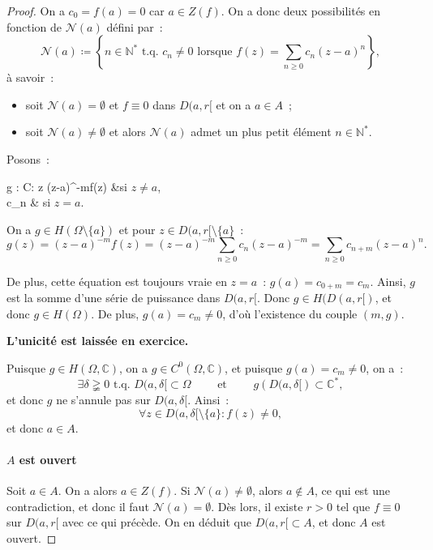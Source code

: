 \documentclass{report}
\theoremstyle{definition}
\theoremstyle{remark}
\numberwithin{equation}{section}
\newcommand{\C}{\mathbb C}
\newcommand{\N}{\mathbb N}
\newcommand{\tq}{\text{ t.q. }}
\begin{document}
\begin{proof}
			On a $c_0 = f(a) = 0$ car $a \in Z(f)$. On a donc deux possibilités en fonction de $\mathcal N(a)$ défini par~:
			\begin{equation}
				\mathcal N(a) \coloneqq \left\{n \in \N^* \tq c_n \neq 0 \text{ lorsque } f(z) = \sum_{n \geq 0}c_n(z-a)^n\right\},
			\end{equation}
			à savoir~:
			\begin{itemize}
				\item soit $\mathcal N(a) = \emptyset$ et $f \equiv 0$ dans $D(a, r[$ et on a $a \in A$~;
				\item soit $\mathcal N(a) \neq \emptyset$ et alors $\mathcal N(a)$ admet un plus petit élément $n \in \N^*$.
			\end{itemize}

			Posons~:
			\begin{subnumcases}
				{g : \Omega \to \C : z \mapsto}
					(z-a)^{-m}f(z) &si $z \neq a$, \\
					c_n & si $z = a$.
			\end{subnumcases}

			On a $g \in H(\Omega \setminus \{a\})$ et pour $z \in D(a, r[ \setminus \{a\}$~:
			\begin{equation}
				g(z) = (z-a)^{-m}f(z) = (z-a)^{-m}\sum_{n \geq 0}c_n(z-a)^{-m} = \sum_{n \geq 0}c_{n+m}(z-a)^n.
			\end{equation}

			De plus, cette équation est toujours vraie en $z=a$~: $g(a) = c_{0+m} = c_m$. Ainsi, $g$ est la somme d'une série de puissance dans $D(a, r[$. Donc
			$g \in H(D(a, r[)$, et donc $g \in H(\Omega)$. De plus, $g(a) = c_m \neq 0$, d'où l'existence du couple $(m, g)$.

			\textbf{L'unicité est laissée en exercice.}

			Puisque $g \in H(\Omega, \C)$, on a $g \in C^0(\Omega, \C)$, et puisque $g(a) = c_m \neq 0$, on a~:
			\begin{equation}
				\exists \delta \gneqq 0 \tq D(a, \delta[ \subset \Omega \qquad \text{ et } \qquad g\left(D(a, \delta[\right) \subset \C^*,
			\end{equation}
			et donc $g$ ne s'annule pas sur $D(a, \delta[$. Ainsi~:
			\begin{equation}
				\forall z \in D(a, \delta[ \setminus \{a\} : f(z) \neq 0,
			\end{equation}
			et donc $a \in A$.

			\paragraph*{$A$ est ouvert} Soit $a \in A$. On a alors $a \in Z(f)$. Si $\mathcal N(a) \neq \emptyset$, alors $a \not \in A$, ce qui est une contradiction,
			et donc il faut $\mathcal N(a) = \emptyset$. Dès lors, il existe $r > 0$ tel que $f \equiv 0$ sur $D(a, r[$ avec ce qui précède. On en déduit que
			$D(a, r[ \subset A$, et donc $A$ est ouvert.


\end{proof}
\end{document}
